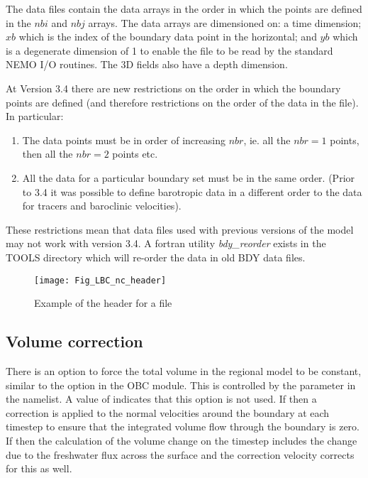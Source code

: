 \documentclass[../tex_main/NEMO_manual]{subfiles}
\begin{document}
The data files contain the data arrays
in the order in which the points are defined in the $nbi$ and $nbj$
arrays. The data arrays are dimensioned on: a time dimension;
$xb$ which is the index of the boundary data point in the horizontal;
and $yb$ which is a degenerate dimension of 1 to enable the file to be
read by the standard NEMO I/O routines. The 3D fields also have a
depth dimension. 

At Version 3.4 there are new restrictions on the order in which the
boundary points are defined (and therefore restrictions on the order
of the data in the file). In particular:

\mbox{}

\begin{enumerate}
\item The data points must be in order of increasing $nbr$, ie. all
  the $nbr=1$ points, then all the $nbr=2$ points etc.
\item All the data for a particular boundary set must be in the same
  order. (Prior to 3.4 it was possible to define barotropic data in a
  different order to the data for tracers and baroclinic velocities). 
\end{enumerate}

\mbox{}

These restrictions mean that data files used with previous versions of
the model may not work with version 3.4. A fortran utility
{\it bdy\_reorder} exists in the TOOLS directory which will re-order the
data in old BDY data files. 

\begin{figure}[!t]     \begin{center}
\texttt{[image: Fig\_LBC\_nc\_header]}
\caption {     \protect\label{fig:LBC_nc_header} 
Example of the header for a \protect{} file}
\end{center}   \end{figure}

\subsection{Volume correction}
\label{subsec:BDY_vol_corr}

There is an option to force the total volume in the regional model to be constant, 
similar to the option in the OBC module. This is controlled  by the  
parameter in the namelist. A value of  indicates that this option is not used. 
If   then a correction is applied to the normal velocities 
around the boundary at each timestep to ensure that the integrated volume flow 
through the boundary is zero. If  then the calculation of 
the volume change on the timestep includes the change due to the freshwater 
flux across the surface and the correction velocity corrects for this as well.
\end{document}
